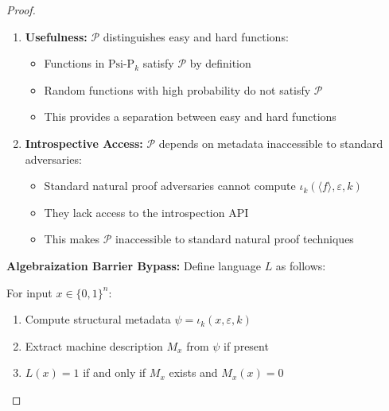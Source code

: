 \documentclass[11pt]{article}
\newcommand{\qed}{\hfill$\square$}
\begin{document}
\begin{proof}
\begin{enumerate}
   \textbf{Rigorous Largeness Proof:}
\begin{proof}
Define structural pattern complexity $C_k(f)$ as minimum description length of k-depth patterns in $f$.
\begin{enumerate}
\item \textbf{Pattern Classification:} Functions $f: \{0,1\}^n \to \{0,1\}$ with $C_k(f) \leq \log n$ form set $S_n^k$
\item \textbf{Counting Bound:} By Kolmogorov complexity: $|S_n^k| \geq 2^{2^n} / n^{O(1)} = 2^{2^n - O(\log n)}$
\item \textbf{Pattern Recognition:} For $f \in S_n^k$, introspection $\iota_k(\langle f \rangle, \varepsilon, k)$ yields compressed pattern in $O(n)$ time
\item \textbf{Verification:} Property $\mathcal{P}(f) = 1$ iff $C_k(f) \leq \log n$, computable in polynomial time
\item \textbf{Largeness Conclusion:} $|\{f \mid \mathcal{P}(f) = 1\}| \geq 2^{2^n - O(\log n)}$ \qed
\end{enumerate}
\end{proof}
\item \textbf{Usefulness:} $\mathcal{P}$ distinguishes easy and hard functions:
   \begin{itemize}
   \item Functions in $\text{Psi-P}_k$ satisfy $\mathcal{P}$ by definition
   \item Random functions with high probability do not satisfy $\mathcal{P}$
   \item This provides a separation between easy and hard functions
   \end{itemize}
\item \textbf{Introspective Access:} $\mathcal{P}$ depends on metadata inaccessible to standard adversaries:
   \begin{itemize}
   \item Standard natural proof adversaries cannot compute $\iota_k(\langle f \rangle, \varepsilon, k)$
   \item They lack access to the introspection API
   \item This makes $\mathcal{P}$ inaccessible to standard natural proof techniques
   \end{itemize}
\end{enumerate}

\textbf{Algebraization Barrier Bypass:}
Define language $L$ as follows:

For input $x \in \{0,1\}^n$:
\begin{enumerate}
\item Compute structural metadata $\psi = \iota_k(x, \varepsilon, k)$
\item Extract machine description $M_x$ from $\psi$ if present
\item $L(x) = 1$ if and only if $M_x$ exists and $M_x(x) = 0$
\end{enumerate}


\end{proof}
\end{document}
